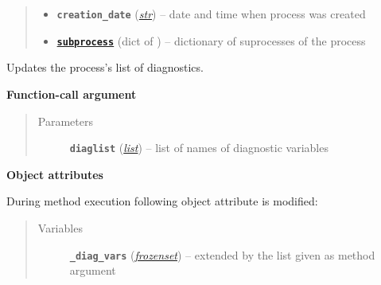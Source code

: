 \documentclass[letterpaper,10pt,english]{sphinxmanual}
\begin{document}
\begin{fulllineitems}
\begin{quote}
\begin{description}
\begin{itemize}
\item {} 
\textbf{\texttt{creation\_date}} (\href{http://docs.python.org/2.7/library/functions.html\#str}{\emph{str}}) -- date and time when process was created

\item {} 
\href{http://docs.python.org/2.7/library/subprocess.html\#module-subprocess}{\textbf{\texttt{subprocess}}} (dict of {\hyperref[api/climlab.process:climlab.process.process.Process]{\emph{}}}) -- dictionary of suprocesses of the process

\end{itemize}

\end{description}\end{quote}

\begin{fulllineitems}
\label{api/climlab.process:climlab.process.process.Process.add_diagnostics}
Updates the process's list of diagnostics.

\textbf{Function-call argument}
\begin{quote}\begin{description}
\item[{Parameters}] \leavevmode
\textbf{\texttt{diaglist}} (\href{http://docs.python.org/2.7/library/functions.html\#list}{\emph{list}}) -- list of names of diagnostic variables

\end{description}\end{quote}

\textbf{Object attributes}

During method execution following object attribute is modified:
\begin{quote}\begin{description}
\item[{Variables}] \leavevmode
\textbf{\texttt{\_diag\_vars}} (\href{http://docs.python.org/2.7/library/stdtypes.html\#frozenset}{\emph{frozenset}}) -- extended by the list  given as 
method argument

\end{description}\end{quote}

\end{fulllineitems}



\end{fulllineitems}
\end{document}
